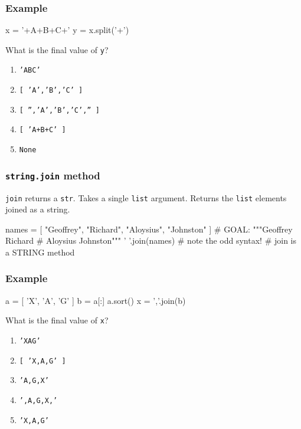 \documentclass[11pt]{beamer}
\begin{document}
\begin{frame}[fragile]
  \frametitle{Example}
  \Enlarge

  \begin{semiverbatim}
x = '+A+B+C+'
y = x.split('+')
  \end{semiverbatim}
  What is the final value of \texttt{y}?
  \begin{enumerate}[label=\Alph*]
  \item  \texttt{'ABC'}
  \item  \texttt{[ 'A','B','C' ]}
  \item  \texttt{[ '','A','B','C','' ]} %
  \item  \texttt{[ 'A+B+C' ]}
  \item  \texttt{None}
  \end{enumerate}
\end{frame}

\begin{frame}[fragile]
  \frametitle{\texttt{string.join} method}
  \Enlarge

  \begin{itemize}
  \myitem  \texttt{join} returns a \texttt{str}. %
  \myitem  Takes a single \texttt{list} argument. %
  \myitem  Returns the \texttt{list} elements joined as a string. %
  \end{itemize}
  \begin{semiverbatim}
names = [ "Geoffrey", "Richard",
          "Aloysius", "Johnston" ]
#  GOAL:  """Geoffrey Richard
#            Aloysius Johnston""" %
' '.join(names)     # note the odd syntax!
                    # join is a STRING method
  \end{semiverbatim}
\end{frame}

\begin{frame}[fragile]
  \frametitle{Example}
  \Enlarge

  \begin{semiverbatim}
a = [ 'X', 'A', 'G' ]
b = a[:]
a.sort()
x = ','.join(b)
  \end{semiverbatim}
  What is the final value of \texttt{x}?
  \begin{enumerate}[label=\Alph*]
  \item  \texttt{'XAG'}
  \item  \texttt{[ 'X,A,G' ]}
  \item  \texttt{'A,G,X'}
  \item  \texttt{',A,G,X,'}
  \item  \texttt{'X,A,G'} %
  \end{enumerate}
\end{frame}
\end{document}
